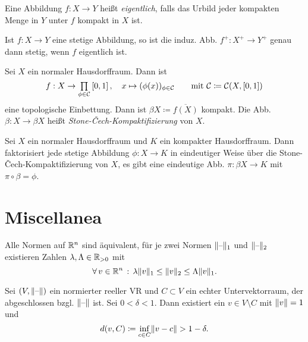 \documentclass{cheat-sheet}
\newcommand{\Cont}{\mathcal{C}} %
\begin{document}
\begin{defn}
  Eine Abbildung $f : X \to Y$ heißt \emph{eigentlich}, falls das Urbild jeder kompakten Menge in $Y$ unter $f$ kompakt in $X$ ist.
\end{defn}

\begin{prop}
  Ist $f : X \to Y$ eine stetige Abbildung, so ist die induz. Abb. $f^+ : X^+ \to Y^+$ genau dann stetig, wenn $f$ eigentlich ist.
\end{prop}


\begin{defn}
  Sei $X$ ein normaler Hausdorffraum. Dann ist
  \[
    f : X \to \prod_{\phi \in \Cont} \I, \quad x \mapsto (\phi(x))_{\phi \in \Cont}
    \qquad \text{mit } \Cont \coloneqq \Cont(X, \I)
  \]
  eine topologische Einbettung. Dann ist $\beta X \coloneqq \overline{f(X)}$ kompakt. Die Abb. $\beta : X \to \beta X$ heißt \emph{Stone-Čech-Kompaktifizierung} von $X$.
\end{defn}

\begin{prop}
  Sei $X$ ein normaler Hausdorffraum und $K$ ein kompakter Hausdorffraum. Dann faktorisiert jede stetige Abbildung $\phi : X \to K$ in eindeutiger Weise über die Stone-Čech-Kompaktifizierung von $X$, \dh{} es gibt eine eindeutige Abb. $\pi : \beta X \to K$ mit $\pi \circ \beta = \phi$.
\end{prop}

\section{Miscellanea}


\begin{lem}
  Alle Normen auf $\mathbb{R}^n$ sind äquivalent, \dh{} für je zwei Normen $\lVert\text{--}\rVert_1$ und $\lVert\text{--}\rVert_2$ existieren Zahlen $\lambda, \Lambda \in \mathbb{R}_{> 0}$ mit
  \[ \forall \, {v \in \mathbb{R}^n} \,:\, \lambda \lVert v\rVert_1 \leq \lVert v\rVert_2 \leq \Lambda \lVert v\rVert_1. \]
\end{lem}

\begin{lem}[Riesz]
  Sei $(V, \lVert\text{--}\rVert)$ ein normierter reeller VR und $C \subset V$ ein echter Untervektorraum, der abgeschlossen bzgl. $\lVert\text{--}\rVert$ ist. Sei $0 < \delta < 1$. Dann existiert ein $v \in V \setminus C$ mit $\lVert v\rVert = 1$ und
  \[ d(v, C) \coloneqq \inf_{c \in C} \lVert v - c\rVert > 1 - \delta. \]
\end{lem}
\end{document}
